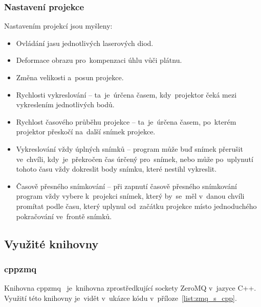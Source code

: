 \subsubsection{Nastavení projekce}
Nastavením projekcí jsou myšleny:
\begin{itemize}
\item Ovládání jasu jednotlivých laserových diod.
\item Deformace obrazu pro~kompenzaci úhlu vůči plátnu.
\item Změna velikosti a~posun projekce. 
\item Rychlosti vykreslování -- ta~je~úrčena časem, kdy~projektor čeká mezi vykreslením jednotlivých bodů.
\item Rychlost časového průběhu projekce -- ta~je~úrčena časem, po~kterém projektor přeskočí na~další snímek projekce.
\item Vykreslování vždy úplných snímků -- program může buď snímek přerušit ve~chvíli, kdy~je~překročen čas úrčený pro~snímek, nebo může po~uplynutí tohoto času vždy dokreslit body snímku, které nestihl vykreslit.
\item Časově přesného snímkování -- při zapnutí časově přesného snímkování program vždy vybere k~projekci snímek, který by~se~měl v~danou chvíli promítat podle času, který uplynul od~začátku projekce místo jednoduchého pokračování ve~frontě snímků.
\end{itemize}


\subsection{Využité knihovny}
\subsubsection{cppzmq}\label{sec:ls_cppzmq}
Knihovna cppzmq~\cite{cppzmq} je~knihovna zprostředkující sockety ZeroMQ v~jazyce C++. Využití této knihovny je~vidět v~ukázce kódu v~příloze~\ref{list:zmq_s_cpp}.

